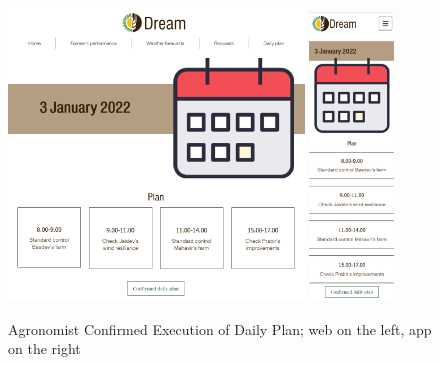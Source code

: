 \documentclass{article}
\begin{document}
        \begin{figure} [h]
            \centering
            \includegraphics[width=0.7\textwidth]{images/UserInterfaces/Agronomist/DailyPlan/ConfirmedExecutionWeb.png}
            \quad
            \includegraphics[width=0.2\textwidth]{images/UserInterfaces/Agronomist/DailyPlan/ConfirmedExecutionApp.png}
            \quad
            \caption{\label{fig:agronomistDPConfirmedExecution}Agronomist Confirmed Execution of Daily Plan; web on the left, app on the right}
        \end{figure}
        \newpage
\end{document}
